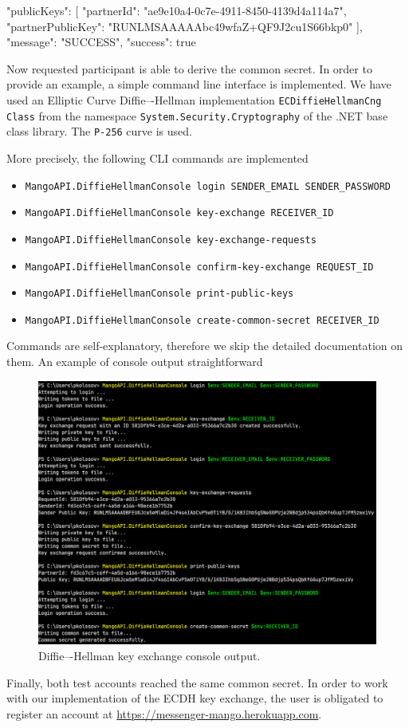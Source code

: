 \begin{spverbatim}
{
    "publicKeys": [
        {
            "partnerId": "ae9e10a4-0c7e-4911-8450-4139d4a114a7",
            "partnerPublicKey": "RUNLMSAAAAAbc49wfaZ+QF9J2cu1S66bkp0"
        }
    ],
    "message": "SUCCESS",
    "success": true
}
\end{spverbatim}
Now requested participant is able to derive the common secret.
In order to provide an example, a simple command line interface is implemented.
We have used an Elliptic Curve Diffie–-Hellman implementation \texttt{ECDiffieHellmanCng Class} from the namespace
\texttt{System.Security.Cryptography} of the .NET base class library.
The \texttt{P-256} curve is used.

More precisely, the following CLI commands are implemented
\begin{itemize}
    \item \texttt{MangoAPI.DiffieHellmanConsole login SENDER\_EMAIL SENDER\_PASSWORD}
    \item \texttt{MangoAPI.DiffieHellmanConsole key-exchange RECEIVER\_ID}
    \item \texttt{MangoAPI.DiffieHellmanConsole key-exchange-requests}
    \item \texttt{MangoAPI.DiffieHellmanConsole confirm-key-exchange REQUEST\_ID}
    \item \texttt{MangoAPI.DiffieHellmanConsole print-public-keys}
    \item \texttt{MangoAPI.DiffieHellmanConsole create-common-secret RECEIVER\_ID}
\end{itemize}
Commands are self-explanatory, therefore we skip the detailed documentation on them.
An example of console output straightforward
\begin{figure}[H]
    \centering
    \includegraphics[width=1\textwidth]{Pictures/08_Diffie-Hellman_console_output}
    \caption{Diffie–-Hellman key exchange console output.}\label{fig:figure7}
\end{figure}
Finally, both test accounts reached the same common secret.
In order to work with our implementation of the ECDH key exchange, the user is obligated to register an account
at \href{https://messenger-mango.herokuapp.com}{https://messenger-mango.herokuapp.com}.